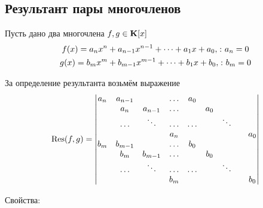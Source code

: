 \subsection{Результант пары многочленов}

Пусть дано два многочлена $f,g\in\mathbf{K}[x]$
\begin{gather*}
  f(x) = a_nx^n+a_{n-1}x^{n-1}+\dots+a_1x+a_0,\colon a_n = 0\\
  g(x) = b_mx^m+b_{m-1}x^{m-1}+\dots+b_1x+b_0,\colon b_m = 0
\end{gather*}

За определение результанта возьмём выражение
$$
\operatorname{Res}(f,g) = \left|\begin{matrix}
a_n & a_{n-1} &         & \dots & a_0   &     &        &     \\
    & a_n     & a_{n-1} & \dots &       & a_0 &        &     \\
    & \dots   & \ddots  & \dots & \dots &     & \ddots &     \\
    &         &         & a_n   &       &     & &      & a_0 \\
b_m & b_{m-1} &         & \dots & b_0   &     &        &     \\
    & b_m     & b_{m-1} & \dots &       & b_0 &        &     \\
    & \dots   & \ddots  & \dots & \dots &     & \ddots &     \\
    &         &         & b_m   &       &     & &      & b_0
\end{matrix}\right|
$$

Свойства:

